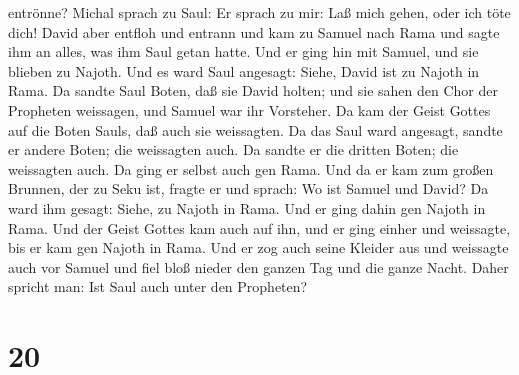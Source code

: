 entrönne? Michal sprach zu Saul: Er sprach zu mir: Laß mich gehen, oder
ich töte dich!  David aber entfloh und entrann und kam zu
Samuel nach Rama und sagte ihm an alles, was ihm Saul getan hatte. Und
er ging hin mit Samuel, und sie blieben zu Najoth.  Und es
ward Saul angesagt: Siehe, David ist zu Najoth in Rama.  Da
sandte Saul Boten, daß sie David holten; und sie sahen den Chor der
Propheten weissagen, und Samuel war ihr Vorsteher. Da kam der Geist
Gottes auf die Boten Sauls, daß auch sie weissagten.  Da
das Saul ward angesagt, sandte er andere Boten; die weissagten auch. Da
sandte er die dritten Boten; die weissagten auch.  Da ging
er selbst auch gen Rama. Und da er kam zum großen Brunnen, der zu Seku
ist, fragte er und sprach: Wo ist Samuel und David? Da ward ihm gesagt:
Siehe, zu Najoth in Rama.  Und er ging dahin gen Najoth in
Rama. Und der Geist Gottes kam auch auf ihn, und er ging einher und
weissagte, bis er kam gen Najoth in Rama.  Und er zog auch
seine Kleider aus und weissagte auch vor Samuel und fiel bloß nieder den
ganzen Tag und die ganze Nacht. Daher spricht man: Ist Saul auch unter
den Propheten?

\hypertarget{section-19}{%
\section{20}\label{section-19}}

